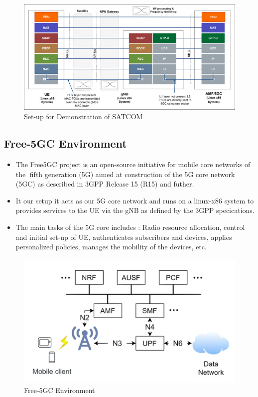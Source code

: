 \begin{figure}[h!]
\centering
\includegraphics[width=1.05\columnwidth]{./Figures/SATCOM_setup1.png}
\caption{Set-up for Demonstration of SATCOM}
\label{SATCOM_setup}
\end{figure}



\subsection{Free-5GC Environment}
\begin{itemize}
	\item The Free5GC project is an open-source initiative for mobile core networks of the fifth generation (5G) aimed at construction of the 5G core network (5GC) as described in 3GPP Release 15 (R15) and futher.
	\item It our setup it acts as our 5G core network and runs on a linux-x86 system to provides services to the UE via the gNB as defined by the 3GPP specications.
	\item The main tasks of the 5G core includes : Radio resource allocation, control and initial set-up of UE, authenticates subscribers and devices, applies personalized policies, manages the mobility of the devices, etc.~\cite{Free5GC}
\end{itemize}
\begin{figure}[h!]
\centering
\includegraphics[width=0.8\columnwidth]{./Figures/Free5GC.png}
\caption{Free-5GC Environment}
\label{Free5GC}
\end{figure}


